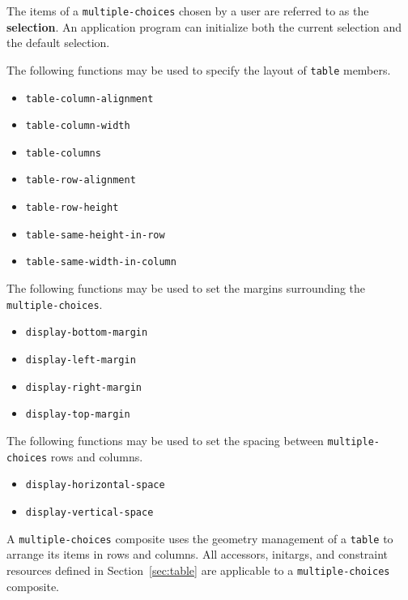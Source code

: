 The items of a {\tt multiple-choices} chosen by a user are referred to as the {\bf
selection}\footnotemark{}.  An application program can initialize both
the current selection and the default selection.  

The following functions may be used to specify the layout of {\tt table}
members.

\begin{itemize}
\item {\tt table-column-alignment}
\item {\tt table-column-width}
\item {\tt table-columns}
\item {\tt table-row-alignment}
\item {\tt table-row-height}
\item {\tt table-same-height-in-row}
\item {\tt table-same-width-in-column}
\end{itemize}


The following functions may be used to set the margins surrounding the {\tt
multiple-choices}.

\begin{itemize}
\item {\tt display-bottom-margin}
\item {\tt display-left-margin}
\item {\tt display-right-margin}
\item {\tt display-top-margin}
\end{itemize}

\pagebreak
The following functions may be used to set the spacing between  {\tt multiple-choices} rows
and columns.

\begin{itemize}
\item {\tt display-horizontal-space}
\item {\tt display-vertical-space}
\end{itemize}



A {\tt multiple-choices} composite uses the
geometry management of a {\tt table} to arrange its items in rows and columns.
All accessors, initargs, and constraint resources defined in
Section~\ref{sec:table} are applicable to a {\tt multiple-choices} composite.


